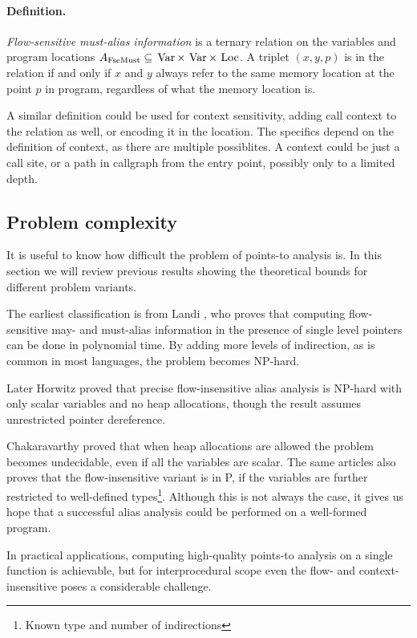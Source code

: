 \paragraph{Definition.} {\it Flow-sensitive must-alias information} is a ternary
relation on the variables and program locations $A_{\mathrm{FseMust}} \subseteq
\operatorname*{\,Var} \times \operatorname*{\,Var} \times \operatorname*{\,Loc}$. A triplet $(x,y,p)$ is in the relation if and only if $x$
and $y$ always refer to the same memory location at the point $p$ in program,
regardless of what the memory location is.

A similar definition could be used for context sensitivity, adding call context
to the relation as well, or encoding it in the location. The specifics depend on
the definition of context, as there are multiple possiblites. A context could be
just a call site, or a path in callgraph from the entry point, possibly only to
a limited depth.

\subsection{Problem complexity}

It is useful to know how difficult the problem of points-to analysis is. In this
section we will review previous results showing the theoretical bounds for
different problem variants.

The earliest classification is from Landi \cite{Landi1991}, who proves that
computing flow-sensitive may- and must-alias information in the presence of
single level pointers can be done in polynomial time. By adding more levels of
indirection, as is common in most languages, the problem becomes NP-hard.

Later Horwitz \cite{Horwitz1997}  proved that precise flow-insensitive alias
analysis is NP-hard with only scalar variables and no heap allocations, though
the result assumes unrestricted pointer dereference.

Chakaravarthy \cite{ptcomp} proved that when heap allocations are allowed the
problem becomes undecidable, even if all the variables are scalar. The same
articles also proves that the flow-insensitive variant is in P, if the
variables are further restricted to well-defined types\footnote{Known type and
number of indirections}. Although this is not always the case, it gives us hope
that a successful alias analysis could be performed on a well-formed program.

In practical applications, computing high-quality points-to analysis on a single
function is achievable, but for interprocedural scope even the flow- and
context-insensitive poses a considerable challenge.

